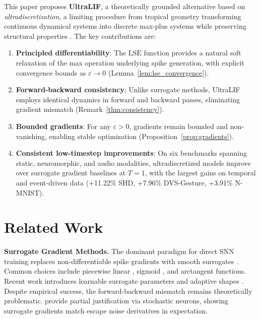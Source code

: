 \documentclass{article}
\theoremstyle{plain}
\theoremstyle{definition}
\theoremstyle{remark}
\newcommand{\lse}{\mathrm{LSE}}
\newcommand{\eps}{\varepsilon}
\begin{document}
This paper proposes \textbf{UltraLIF}, a theoretically grounded alternative based on \emph{ultradiscretization}, a limiting procedure from tropical geometry transforming continuous dynamical systems into discrete max-plus systems while preserving structural properties \citep{tokihiro1996ultra, grammaticos2004discrete}. The key contributions are:

\begin{enumerate}
    \item \textbf{Principled differentiability}: The $\lse$ function provides a natural soft relaxation of the max operation underlying spike generation, with explicit convergence bounds as $\eps \to 0$ (Lemma~\ref{lem:lse_convergence}).

    \item \textbf{Forward-backward consistency}: Unlike surrogate methods, UltraLIF employs identical dynamics in forward and backward passes, eliminating gradient mismatch (Remark~\ref{thm:consistency}).

    \item \textbf{Bounded gradients}: For any $\eps > 0$, gradients remain bounded and non-vanishing, enabling stable optimization (Proposition~\ref{prop:gradients}).

    \item \textbf{Consistent low-timestep improvements}: On six benchmarks spanning static, neuromorphic, and audio modalities, ultradiscretized models improve over surrogate gradient baselines at $T{=}1$, with the largest gains on temporal and event-driven data (+11.22\% SHD, +7.96\% DVS-Gesture, +3.91\% N-MNIST).
\end{enumerate}

\section{Related Work}
\label{sec:related}

\textbf{Surrogate Gradient Methods.} The dominant paradigm for direct SNN training replaces non-differentiable spike gradients with smooth surrogates \citep{neftci2019surrogate}. Common choices include piecewise linear \citep{bellec2018long}, sigmoid \citep{zenke2018superspike}, and arctangent \citep{fang2021incorporating} functions. Recent work introduces learnable surrogate parameters \citep{lian2023learnable} and adaptive shapes \citep{li2021differentiable}. Despite empirical success, the forward-backward mismatch remains theoretically problematic. \citet{gygax2025elucidating} provide partial justification via stochastic neurons, showing surrogate gradients match escape noise derivatives in expectation.
\end{document}
